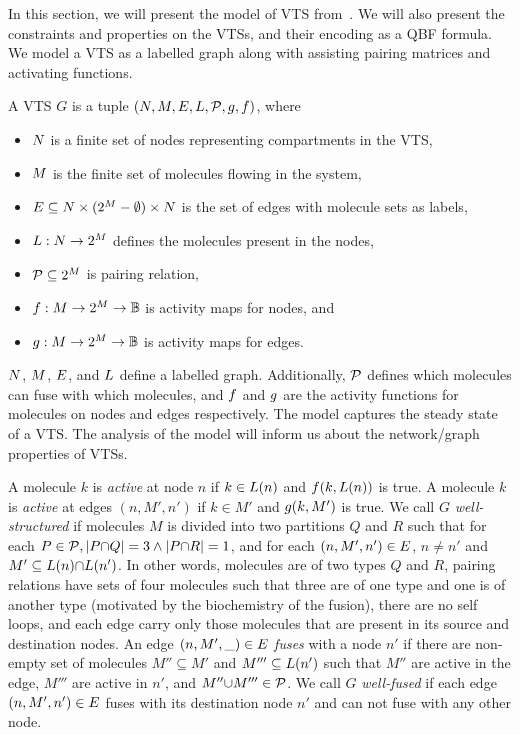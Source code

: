 In this section, we will present the model of VTS from~\cite{smtVTS}.
%
We will also present the constraints and properties on the VTSs, and their
encoding as a QBF formula.   
%
We model a VTS as a labelled graph along with assisting pairing matrices and
activating functions.

\begin{df}
  A VTS $G$ is a tuple $(N,M,E,L,\mathcal{P},g,f)$, where
  \begin{itemize}
  \item $N$ is a finite set of nodes representing compartments in the VTS,
  \item $M$ is the finite set of molecules flowing in the system, 
  \item $E \subseteq N \times (2^{M}-\emptyset) \times N$ is the
    set of edges with molecule sets as labels,
  \item $L : N \rightarrow 2^{M}$ defines the molecules present in the nodes,
  \item $\mathcal{P} \subseteq 2^{M}$ is pairing relation,
  \item $f : M \rightarrow 2^{M} \rightarrow \mathbb{B}$ is activity maps for nodes, and
  \item $g : M \rightarrow 2^{M} \rightarrow \mathbb{B} $ is activity maps for edges.
  \end{itemize}
\end{df}
$N$, $M$, $E$, and $L$ define a labelled graph.
%
Additionally, $\mathcal{P}$ defines which molecules can fuse with which molecules,
and
$f$ and $g$ are the activity functions for molecules on
nodes and edges respectively.
%
The model captures the steady state of a VTS.
%
The analysis of the model will inform us about the network/graph
properties of VTSs.

%
A molecule $k$ is {\em active} at node $n$ if $k \in L(n)$ and
$f(k,L(n))$ is true.
%
A molecule $k$ is {\em active} at edges $(n,M',n')$ if $k \in M'$ and
$g(k,M')$ is true.
%
We call $G$ {\em well-structured} if molecules $M$ is divided into
two partitions $Q$ and $R$ such that
for each $P \in \mathcal{P}, |P {\cap} Q| = 3 \land |P {\cap} R| = 1 $, and
for each $(n,M',n') \in E$, $n \neq n'$ and
$M' \subseteq L(n) {\cap} L(n')$.
%
In other words,
molecules are of two types $Q$ and $R$,
%
pairing relations have sets of four molecules such that three
are of one type and one is of another type
(motivated by the biochemistry of the fusion),
%
there are no self loops, and 
each edge carry only those molecules that are present in its source
and destination nodes.
%
An edge $(n,M',\_) \in E$ {\em fuses} with a node $n'$
if there are non-empty set of molecules $M'' \subseteq M'$ and $M''' \subseteq L(n')$
such that $M''$ are active in the edge, $M'''$ are active in $n'$, and $M'' {\cup} M''' \in \mathcal{P}$.
%
We call $G$ {\em well-fused} if each edge $(n,M',n') \in E$ fuses
with its destination node $n'$
and can not fuse with any other node.

